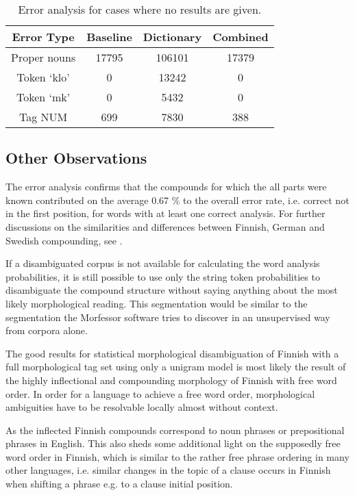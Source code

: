 \documentclass[postprint]{flammie}
\begin{document}
\begin{table}[h!]
  \centering
  \caption{Error analysis for cases where no results are given.
  }\label{tab:incorrect1}
  \begin{scriptsize}
    \begin{tabular}{c|c|c|c}
      \hline
      Error Type & Baseline & Dictionary & Combined \\
      \hline
	  Proper nouns & 17795 & 106101 & 17379 \\
	  \hline
	  Token `klo' & 0 & 13242 & 0 \\
	  Token `mk' & 0 & 5432 & 0 \\
	  \hline
	  Tag NUM & 699 & 7830 & 388 \\
	  \hline 
    \end{tabular}
  \end{scriptsize}
\end{table}

\subsection{Other Observations}

The error analysis confirms that the compounds for which the all parts
were known contributed on the average 0.67 \% to the overall error
rate, i.e. correct not in the first position, for words with at least
one correct analysis. For further discussions on the similarities and
differences between Finnish, German and Swedish compounding, see
\cite{linden09nodalida}.

If a disambiguated corpus is not available for calculating the word
analysis probabilities, it is still possible to use only the string
token probabilities to disambiguate the compound structure without
saying anything about the most likely morphological reading. This
segmentation would be similar to the segmentation the Morfessor
software \cite{creutz2005} tries to discover in an unsupervised way
from corpora alone.

The good results for statistical morphological disambiguation of
Finnish with a full morphological tag set using only a unigram model
is most likely the result of the highly inflectional and compounding
morphology of Finnish with free word order. In order for a language to
achieve a free word order, morphological ambiguities have to be
resolvable locally almost without context. 

As the inflected Finnish compounds correspond to noun phrases or
prepositional phrases in English. This also sheds some additional
light on the supposedly free word order in Finnish, which is similar
to the rather free phrase ordering in many other languages,
i.e. similar changes in the topic of a clause occurs in Finnish when
shifting a phrase e.g. to a clause initial position.
\end{document}
